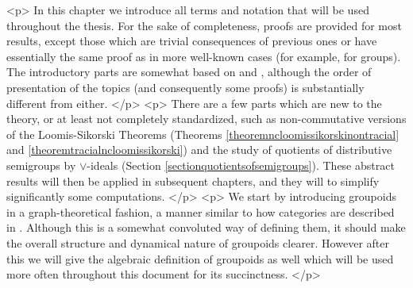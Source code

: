 <p>
In this chapter we introduce all terms and notation that will be used throughout the thesis. For the sake of completeness, proofs are provided for most results, except those which are trivial consequences of previous ones or have essentially the same proof as in more well-known cases (for example, for groups). The introductory parts are somewhat based on \cite{MR1724106} and \cite{MR0466355}, although the order of presentation of the topics (and consequently some proofs) is substantially different from either.
</p>
<p>
There are a few parts which are new to the theory, or at least not completely standardized, such as %
non-commutative versions of the Loomis-Sikorski Theorems (Theorems \ref{theoremncloomissikorskinontracial} and \ref{theoremtracialncloomissikorski}) and the study of quotients of distributive semigroups by $\lor$-ideals (Section \ref{sectionquotientsofsemigroups}). These abstract results will then be applied in subsequent chapters, and they will to simplify significantly some computations.
</p>
<p>
We start by introducing groupoids in a graph-theoretical fashion, a manner similar to how categories are described in \cite{MR1712872}. Although this is a somewhat convoluted way of defining them, it should make the overall structure and dynamical nature of groupoids clearer. However after this we will give the algebraic definition of groupoids as well which will be used more often throughout this document for its succinctness.
</p>